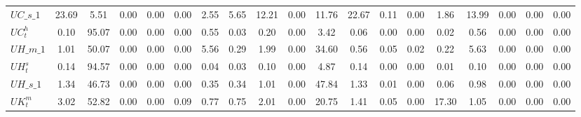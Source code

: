 \begin{center}
\begin{longtable}{lcccccccccccccccccc}
$UC\_s\_1           $	 & 	            23.69	 & 	             5.51	 & 	             0.00	 & 	             0.00	 & 	             0.00	 & 	             2.55	 & 	             5.65	 & 	            12.21	 & 	             0.00	 & 	            11.76	 & 	            22.67	 & 	             0.11	 & 	             0.00	 & 	             1.86	 & 	            13.99	 & 	             0.00	 & 	             0.00	 & 	             0.00 \\ 
$ UC^h_t            $	 & 	             0.10	 & 	            95.07	 & 	             0.00	 & 	             0.00	 & 	             0.00	 & 	             0.55	 & 	             0.03	 & 	             0.20	 & 	             0.00	 & 	             3.42	 & 	             0.06	 & 	             0.00	 & 	             0.00	 & 	             0.02	 & 	             0.56	 & 	             0.00	 & 	             0.00	 & 	             0.00 \\ 
$UH\_m\_1           $	 & 	             1.01	 & 	            50.07	 & 	             0.00	 & 	             0.00	 & 	             0.00	 & 	             5.56	 & 	             0.29	 & 	             1.99	 & 	             0.00	 & 	            34.60	 & 	             0.56	 & 	             0.05	 & 	             0.02	 & 	             0.22	 & 	             5.63	 & 	             0.00	 & 	             0.00	 & 	             0.00 \\ 
$  UH^s_t           $	 & 	             0.14	 & 	            94.57	 & 	             0.00	 & 	             0.00	 & 	             0.00	 & 	             0.04	 & 	             0.03	 & 	             0.10	 & 	             0.00	 & 	             4.87	 & 	             0.14	 & 	             0.00	 & 	             0.00	 & 	             0.01	 & 	             0.10	 & 	             0.00	 & 	             0.00	 & 	             0.00 \\ 
$UH\_s\_1           $	 & 	             1.34	 & 	            46.73	 & 	             0.00	 & 	             0.00	 & 	             0.00	 & 	             0.35	 & 	             0.34	 & 	             1.01	 & 	             0.00	 & 	            47.84	 & 	             1.33	 & 	             0.01	 & 	             0.00	 & 	             0.06	 & 	             0.98	 & 	             0.00	 & 	             0.00	 & 	             0.00 \\ 
$  UK^m_t           $	 & 	             3.02	 & 	            52.82	 & 	             0.00	 & 	             0.00	 & 	             0.09	 & 	             0.77	 & 	             0.75	 & 	             2.01	 & 	             0.00	 & 	            20.75	 & 	             1.41	 & 	             0.05	 & 	             0.00	 & 	            17.30	 & 	             1.05	 & 	             0.00	 & 	             0.00	 & 	             0.00 \\ 

\end{longtable}
\end{center}
